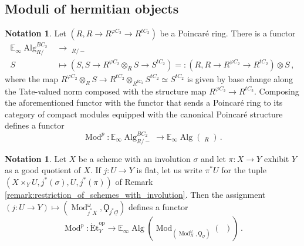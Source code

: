 \documentclass{article}
\DeclareMathOperator{\Alg}{Alg} %
\DeclareMathOperator{\CAlgp}{CAlg^p} %
\DeclareMathOperator{\Catpidem}{Cat^p_{\infty, idem}} %
\DeclareMathOperator{\Mod}{Mod} %
\newcommand{\EE}{\mathbb{E}}
\newcommand{\op}{\mathrm{op}} %
\theoremstyle{definition}
\newtheorem{notation}[equation]{Notation}
\begin{document}
\subsection{Moduli of hermitian objects}
\begin{notation}\label{notation:poincare_ring_basechange}
    Let $ (R, R\to R^{\varphi C_2} \to R^{tC_2}) $ be a Poincaré ring. 
    There is a functor 
    \begin{equation*}
    \begin{split}
        \EE_\infty\Alg^{BC_2}_{R/} &\to \CAlgp_{R/-} \\
        S & \mapsto (S, S \to R^{\varphi C_2} \otimes_{R} S \to S^{t C_2}) =: (R, R \to R^{\varphi C_2} \to R^{tC_2}) \otimes S \,,
    \end{split}    
    \end{equation*}
    where the map $ R^{\varphi C_2} \otimes_R S \to R^{tC_2} \otimes_{R^{tC_2}} S^{tC_2} \simeq S^{tC_2} $ is given by base change along the Tate-valued norm composed with the structure map $ R^{\varphi C_2} \to R^{tC_2} $. 
    Composing the aforementioned functor with the functor that sends a Poincaré ring to its category of compact modules equipped with the canonical Poincaré structure defines a functor
    \begin{equation*}
        \Mod^p \colon \EE_\infty\Alg^{BC_2}_{R/-} \to \EE_\infty\Alg\left(\Catpidem_{R}\right) \,.
    \end{equation*}
\end{notation}
\begin{notation}\label{notation:scheme_involution_basechange}
    Let $ X $ be a scheme with an involution $ \sigma $ and let $ \pi \colon X \to Y $ exhibit $ Y $ as a good quotient of $ X $. 
    If $ j \colon U \to Y $ is flat, let us write $ \pi^*U $ for the tuple $ (X \times_Y U, j^*(\sigma), U, j^*(\pi)) $ of Remark \ref{remark:restriction_of_schemes_with_involution}. 
    Then the assignment $ (j \colon U \to Y ) \mapsto \left(\Mod^\omega_{j^*X}, \Qoppa_{j^*\underline{\mathcal{O}}}\right) $ defines a functor %
    \begin{equation*}
        \Mod^p \colon \mathrm{\acute{E}t}_Y^\op \to \EE_\infty \Alg\left(\Mod_{\left(\Mod^\omega_X, \Qoppa_{\underline{\mathcal{O}}}\right)}(\Catpidem)\right) \,.
    \end{equation*}
\end{notation}
\end{document}
